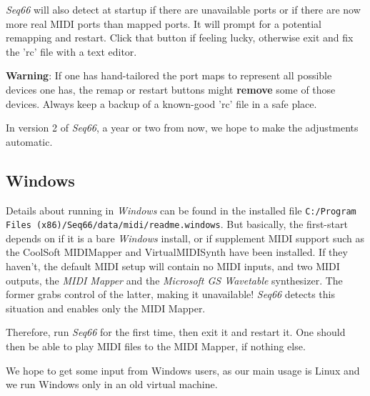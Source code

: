    \textsl{Seq66} will also detect at startup if there are unavailable
   ports or if there are now more real MIDI ports than mapped ports.
   It will prompt for a potential remapping and restart.
   Click that button if feeling lucky, otherwise
   exit and fix the 'rc' file with a text editor.

   \textbf{Warning}:
   If one has hand-tailored the port maps to represent all possible devices one
   has, the remap or restart buttons might \textbf{remove}
   some of those devices.
   Always keep a backup of a known-good 'rc' file in a safe place.

   In version 2 of \textsl{Seq66}, a year or two from now, we hope to make
   the adjustments automatic.

\subsection{Windows}
\label{subsec:introduction_windows}

   Details about running in \textsl{Windows} can be found in the installed file
   \texttt{C:/Program Files (x86)/Seq66/data/midi/readme.windows}.
   But basically, the first-start depends on if it is a bare \textsl{Windows}
   install, or if supplement MIDI support such as 
   the CoolSoft MIDIMapper and VirtualMIDISynth have been installed.
   If they haven't, the default MIDI setup will contain no MIDI inputs,
   and two MIDI outputs, the \textsl{MIDI Mapper} and the
   \textsl{Microsoft GS Wavetable} synthesizer.
   The former grabs control of the latter, making it unavailable!
   \textsl{Seq66} detects this situation and enables only the MIDI Mapper.

   Therefore, run \textsl{Seq66} for the first time, then exit it and
   restart it. One should then be able to play MIDI files to the MIDI Mapper,
   if nothing else.

   We hope to get some input from Windows users, as our main usage is Linux
   and we run Windows only in an old virtual machine.

